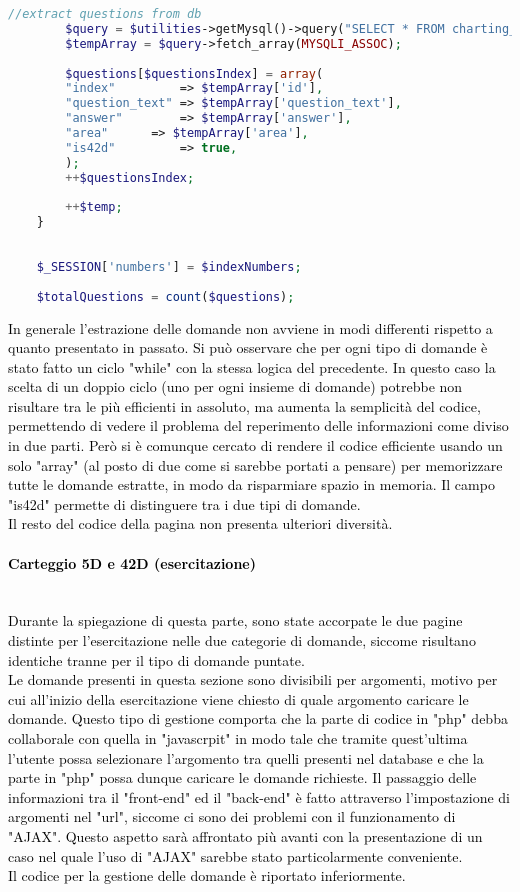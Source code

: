 \begin{lstlisting}[language=php]
		//extract questions from db
		$query = $utilities->getMysql()->query("SELECT * FROM charting_test_42d WHERE (id = '{$indexNumbers['42d'][$temp]}')");
		$tempArray = $query->fetch_array(MYSQLI_ASSOC);  
		
		$questions[$questionsIndex] = array(
		"index"         => $tempArray['id'],
		"question_text" => $tempArray['question_text'],
		"answer"        => $tempArray['answer'],
		"area"		=> $tempArray['area'],	
		"is42d"         => true,
		);
		++$questionsIndex;
		
		++$temp;
	}
	
	
	$_SESSION['numbers'] = $indexNumbers;
	
	$totalQuestions = count($questions);
\end{lstlisting}
\textcolor{black}{In generale l'estrazione delle domande non avviene in modi differenti rispetto a quanto presentato in passato. Si può osservare che per ogni tipo di domande è stato fatto un ciclo "while" con la stessa logica del precedente. In questo caso la scelta di un doppio ciclo (uno per ogni insieme di domande) potrebbe non risultare tra le più efficienti in assoluto, ma aumenta la semplicità del codice, permettendo di vedere il problema del reperimento delle informazioni come diviso in due parti. Però si è comunque cercato di rendere il codice efficiente usando un solo "array" (al posto di due come si sarebbe portati a pensare) per memorizzare tutte le domande estratte, in modo da risparmiare spazio in memoria. Il campo "is42d" permette di distinguere tra i due tipi di domande.\\
Il resto del codice della pagina non presenta ulteriori diversità.}\\

\paragraph{\textcolor{black}{Carteggio 5D e 42D (esercitazione)}}\leavevmode\\
\textcolor{black}{Durante la spiegazione di questa parte, sono state accorpate le due pagine distinte per l'esercitazione nelle due categorie di domande, siccome risultano identiche tranne per il tipo di domande puntate.\\
Le domande presenti in questa sezione sono divisibili per argomenti, motivo per cui all'inizio della esercitazione viene chiesto di quale argomento caricare le domande. Questo tipo di gestione comporta che la parte di codice in "php" debba collaborale con quella in "javascrpit" in modo tale che tramite quest'ultima l'utente possa selezionare l'argomento tra quelli presenti nel database e che la parte in "php" possa dunque caricare le domande richieste. Il passaggio delle informazioni tra il "front-end" ed il "back-end" è fatto attraverso l'impostazione di argomenti nel "url", siccome ci sono dei problemi con il funzionamento di "AJAX". Questo aspetto sarà affrontato più avanti con la presentazione di un caso nel quale l'uso di "AJAX" sarebbe stato particolarmente conveniente.\\
Il codice per la gestione delle domande è riportato inferiormente.}\\

